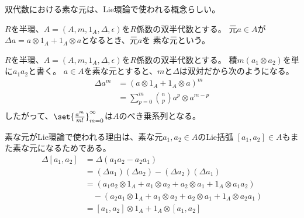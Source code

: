 	双代数における素な元は、Lie環論で使われる概念らしい。

	\begin{definition}[双半代数における素な元]\label{def:双半代数における素な元} %
		$R$を半環、$A=(A,m,1_A,\Delta,\epsilon)$を$R$係数の双半代数とする。
		元$a\in A$が$\Delta a=a\otimes 1_A+1_A\otimes a$となるとき、元$a$を
		素な元という。
	\end{definition} %

	$R$を半環、$A=(A,m,1_A,\Delta,\epsilon)$を$R$係数の双半代数とする。
	積$m(a_1\otimes a_2)$を単に$a_1a_2$と書く。
	$a\in A$を素な元とすると、$m$と$\Delta$は双対だから次のようになる。
	\begin{equation}\begin{split} %
		\Delta a^m &= (a\otimes 1_A+1_A\otimes a)^m \\
			&= \sum_{p=0}^m\binom{n}{p}a^p\otimes a^{m-p} \\
	\end{split}\end{equation} %
	したがって、$\set{\frac{a^m}{m!}}_{m=0}^\infty$は$A$のべき乗系列となる。

	素な元がLie環論で使われる理由は、素な元$a_1,a_2\in A$のLie括弧
	$[a_1,a_2]\in A$もまた素な元になるためである。
	\begin{equation}\begin{split} %
		\Delta[a_1,a_2] &= \Delta(a_1a_2-a_2a_1) \\
			&= (\Delta a_1)(\Delta a_2) - (\Delta a_2)(\Delta a_1) \\
			&= (a_1a_2\otimes 1_A + a_1\otimes a_2 + a_2\otimes a_1 + 1_A\otimes a_1a_2 ) \\
			&\quad - (a_2a_1\otimes 1_A + a_1\otimes a_2 + a_2\otimes a_1 + 1_A\otimes a_2a_1 ) \\
			&= [a_1,a_2]\otimes 1_A + 1_A\otimes [a_1,a_2] \\
	\end{split}\end{equation} %

